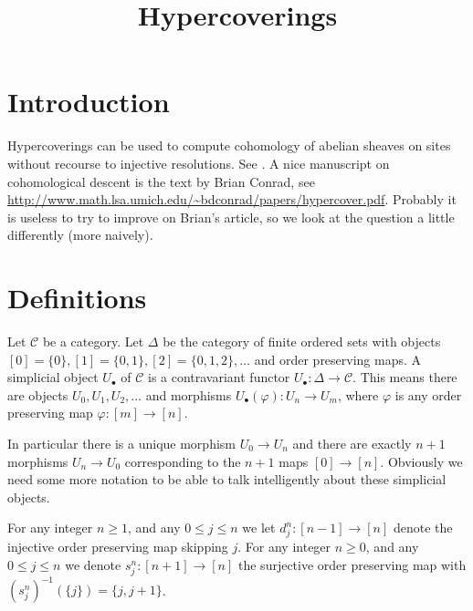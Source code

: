 

%


\title{Hypercoverings}


\maketitle

\tableofcontents

\section{Introduction}
\label{section-introduction}

\noindent
Hypercoverings can be used to compute cohomology of abelian sheaves on sites
without recourse to injective resolutions. See \cite[Expose V, Sec. 7]{SGA4}.
A nice manuscript on cohomological descent is the text by Brian Conrad,
see \url{http://www.math.lsa.umich.edu/~bdconrad/papers/hypercover.pdf}.
Probably it is useless to try to improve on Brian's article, so we look
at the question a little differently (more naively).

\section{Definitions}
\label{section-definitions}

\noindent
Let $\mathcal{C}$ be a category. Let $\Delta$ be the category of finite 
ordered sets with objects $[0]=\{0\}, [1]=\{0,1\}, [2]=\{0,1,2\},\ldots$ 
and order preserving maps. A simplicial object $U_\bullet$ of $\mathcal{C}$ 
is a contravariant functor $U_\bullet : \Delta \to \mathcal{C}$. This means 
there are objects $U_0,U_1,U_2,\ldots$ and morphisms $U_\bullet(\varphi) : 
U_n \to U_m$, where $\varphi$ is any order preserving map 
$\varphi : [m] \to [n]$.

\smallskip\noindent
In particular there is a unique morphism $U_0 \to U_n$ and there are
exactly $n+1$ morphisms $U_n \to U_0$ corresponding to the $n+1$ maps
$[0] \to [n]$. Obviously we need some more notation to be able to talk 
intelligently about these simplicial objects.

\begin{definition}
\label{definition-face-degeneracy}
For any integer $n\geq 1$, and any $0\leq j \leq n$ we let $d^n_j : [n-1]
\to [n]$ denote the injective order preserving map skipping $j$. For any
integer $n\geq 0$, and any $0\leq j \leq n$ we denote $s^n_j : [n+1] 
\to [n]$ the surjective order preserving map with 
$(s^n_j)^{-1}(\{j\}) = \{j, j+1\}$.
\end{definition}

